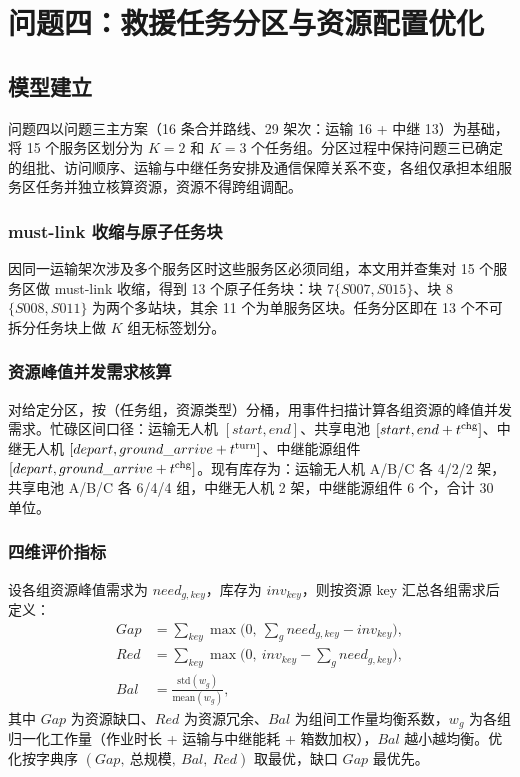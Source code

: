 \section{问题四：救援任务分区与资源配置优化}

\subsection{模型建立}

问题四以问题三主方案（16 条合并路线、29 架次：运输 16 + 中继 13）为基础，将 15 个服务区划分为 $K=2$ 和 $K=3$ 个任务组。分区过程中保持问题三已确定的组批、访问顺序、运输与中继任务安排及通信保障关系不变，各组仅承担本组服务区任务并独立核算资源，资源不得跨组调配。

\subsubsection{must-link 收缩与原子任务块}

因同一运输架次涉及多个服务区时这些服务区必须同组，本文用并查集对 15 个服务区做 must-link 收缩，得到 13 个原子任务块：块 7$\{S007,S015\}$、块 8$\{S008,S011\}$ 为两个多站块，其余 11 个为单服务区块。任务分区即在 13 个不可拆分任务块上做 $K$ 组无标签划分。

\subsubsection{资源峰值并发需求核算}

对给定分区，按（任务组，资源类型）分桶，用事件扫描计算各组资源的峰值并发需求。忙碌区间口径：运输无人机 $[start,end]$、共享电池 $[start,end+t^{\rm chg}]$、中继无人机 $[depart,ground\_arrive+t^{\rm turn}]$、中继能源组件 $[depart,ground\_arrive+t^{\rm chg}]$。现有库存为：运输无人机 A/B/C 各 4/2/2 架，共享电池 A/B/C 各 6/4/4 组，中继无人机 2 架，中继能源组件 6 个，合计 30 单位。

\subsubsection{四维评价指标}

设各组资源峰值需求为 $need_{g,key}$，库存为 $inv_{key}$，则按资源 key 汇总各组需求后定义：
\begin{equation}
\begin{aligned}
Gap &= \sum_{key}\max\!\Big(0,\ \sum_g need_{g,key} - inv_{key}\Big),\\
Red &= \sum_{key}\max\!\Big(0,\ inv_{key} - \sum_g need_{g,key}\Big),\\
Bal &= \frac{\mathrm{std}(w_g)}{\mathrm{mean}(w_g)},
\end{aligned}
\end{equation}
其中 $Gap$ 为资源缺口、$Red$ 为资源冗余、$Bal$ 为组间工作量均衡系数，$w_g$ 为各组归一化工作量（作业时长 + 运输与中继能耗 + 箱数加权），$Bal$ 越小越均衡。优化按字典序 $(Gap,\ \text{总规模},\ Bal,\ Red)$ 取最优，缺口 $Gap$ 最优先。

